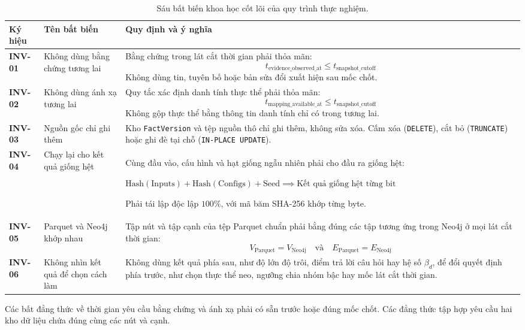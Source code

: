 \begin{table}[htbp]
\centering
\caption{Sáu bất biến khoa học cốt lõi của quy trình thực nghiệm.}
\label{tab:invariants}
\small
\begin{tabularx}{\textwidth}{@{}llX@{}}
\toprule
\textbf{Ký hiệu} & \textbf{Tên bất biến} & \textbf{Quy định và ý nghĩa} \\
\midrule
\textbf{INV-01} & Không dùng bằng chứng tương lai & Bằng chứng trong lát cắt thời gian phải thỏa mãn:
$$t_{\text{evidence\_observed\_at}} \le t_{\text{snapshot\_cutoff}}$$
Không dùng tin, tuyên bố hoặc bản sửa đổi xuất hiện sau mốc chốt. \\
\addlinespace
\textbf{INV-02} & Không dùng ánh xạ tương lai & Quy tắc xác định danh tính thực thể phải thỏa mãn:
$$t_{\text{mapping\_available\_at}} \le t_{\text{snapshot\_cutoff}}$$
Không gộp thực thể bằng thông tin danh tính chỉ có trong tương lai. \\
\addlinespace
\textbf{INV-03} & Nguồn gốc chỉ ghi thêm & Kho \texttt{FactVersion} và tệp nguồn thô chỉ ghi thêm, không sửa xóa. Cấm xóa (\texttt{DELETE}), cắt bỏ (\texttt{TRUNCATE}) hoặc ghi đè tại chỗ (\texttt{IN-PLACE UPDATE}). \\
\addlinespace
\textbf{INV-04} & Chạy lại cho kết quả giống hệt & Cùng đầu vào, cấu hình và hạt giống ngẫu nhiên phải cho đầu ra giống hệt:
\begin{center}\small $\text{Hash}(\text{Inputs}) + \text{Hash}(\text{Configs}) + \text{Seed} \implies \text{Kết quả giống hệt từng bit}$\end{center}
Phải tái lập độc lập $100\%$, với mã băm SHA-256 khớp từng byte. \\
\addlinespace
\textbf{INV-05} & Parquet và Neo4j khớp nhau & Tập nút và tập cạnh của tệp Parquet chuẩn phải bằng đúng các tập tương ứng trong Neo4j ở mọi lát cắt thời gian:
$$V_{\text{Parquet}} = V_{\text{Neo4j}} \quad \text{và} \quad E_{\text{Parquet}} = E_{\text{Neo4j}}$$ \\
\addlinespace
\textbf{INV-06} & Không nhìn kết quả để chọn cách làm & Không dùng kết quả phía sau, như độ lớn độ trôi, điểm trả lời câu hỏi hay hệ số $\beta_d$, để đổi quyết định phía trước, như chọn thực thể neo, ngưỡng chia nhóm bậc hay mốc lát cắt thời gian. \\
\bottomrule
\end{tabularx}
\end{table}
Các bất đẳng thức về thời gian yêu cầu bằng chứng và ánh xạ phải có sẵn trước hoặc đúng mốc chốt. Các đẳng thức tập hợp yêu cầu hai kho dữ liệu chứa đúng cùng các nút và cạnh.
